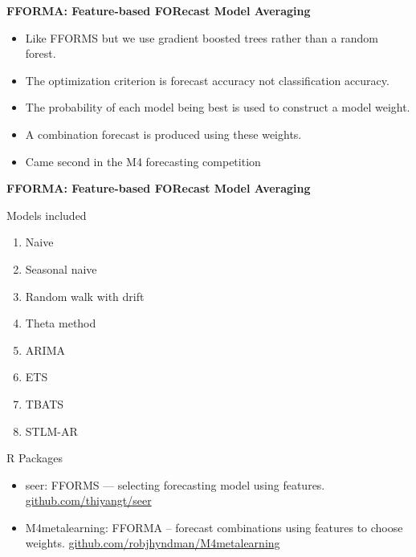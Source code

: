 \documentclass[14pt,ignorenonframetext,]{beamer}
\providecommand{\tightlist}{%
  \setlength{\itemsep}{0pt}\setlength{\parskip}{0pt}}
\begin{document}
\begin{frame}{\fontsize{15}{15}\sffamily\bfseries FFORMA: Feature-based FORecast Model Averaging}
\protect\hypertarget{section-1}{}

\begin{itemize}
\tightlist
\item
  Like FFORMS but we use gradient boosted trees rather than a random
  forest.
\item
  The optimization criterion is forecast accuracy not classification
  accuracy.
\item
  The probability of each model being best is used to construct a model
  weight.
\item
  A combination forecast is produced using these weights.
\item
  \alert{Came second in the M4 forecasting competition}
\end{itemize}

\end{frame}

\begin{frame}{\fontsize{15}{15}\sffamily\bfseries FFORMA: Feature-based FORecast Model Averaging}
\protect\hypertarget{section-2}{}

\begin{block}{Models included}

\begin{enumerate}
\tightlist
\item
  Naive
\item
  Seasonal naive
\item
  Random walk with drift
\item
  Theta method
\item
  ARIMA
\item
  ETS
\item
  TBATS
\item
  STLM-AR
\end{enumerate}

\end{block}

\end{frame}

\begin{frame}{R Packages}
\protect\hypertarget{r-packages}{}

\fontsize{14.5}{19}\sf

\begin{itemize}
\item
  \alert{seer}: FFORMS --- selecting forecasting model using features.
  \newline\url{github.com/thiyangt/seer}\vspace*{0.5cm}
\item
  \alert{M4metalearning}: FFORMA -- forecast combinations using features
  to choose weights. \newline\url{github.com/robjhyndman/M4metalearning}
\end{itemize}

\end{frame}
\end{document}
